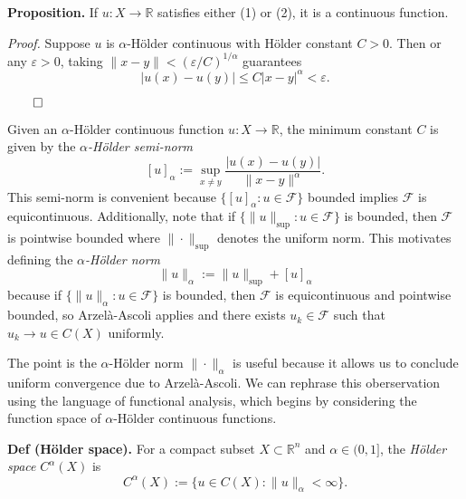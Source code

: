 \documentclass[
]{article}
\renewcommand{\square}{\hfill\qed}
\begin{document}
\textbf{Proposition.} If \(u: X \to \mathbb{R}\) satisfies either (1) or
(2), it is a continuous function.

\emph{Proof.} Suppose \(u\) is \(\alpha\)-Hölder continuous with Hölder
constant \(C > 0\). Then or any \(\varepsilon > 0\), taking
\(\|x-y\| < (\varepsilon/C)^{1/\alpha}\) guarantees \[
    |u(x)-u(y)| \leq C|x-y|^{\alpha} < \varepsilon.
\]

\(\square\)

Given an \(\alpha\)-Hölder continuous function \(u: X \to \mathbb{R}\),
the minimum constant \(C\) is given by the \emph{\(\alpha\)-Hölder
semi-norm} \[
    [u]_{\alpha} := \sup_{x \neq y}\frac{|u(x) - u(y)|}{\|x-y\|^{\alpha}}.
\] This semi-norm is convenient because
\(\{ [u]_{\alpha}: u \in \mathcal{F}\}\) bounded implies \(\mathcal{F}\)
is equicontinuous. Additionally, note that if
\(\{ \|u\|_{\sup}: u \in \mathcal{F}\}\) is bounded, then
\(\mathcal{F}\) is pointwise bounded where \(\| \cdot \|_{\sup}\)
denotes the uniform norm. This motivates defining the
\emph{\(\alpha\)-Hölder norm} \[
    \|u\|_{\alpha} := \|u\|_{\sup} + [u]_{\alpha}
\] because if \(\{\|u\|_{\alpha}: u \in \mathcal{F}\}\) is bounded, then
\(\mathcal{F}\) is equicontinuous and pointwise bounded, so
Arzelà-Ascoli applies and there exists \(u_k \in \mathcal{F}\) such that
\(u_k \to u \in C(X)\) uniformly.

The point is the \(\alpha\)-Hölder norm \(\|\cdot\|_{\alpha}\) is useful
because it allows us to conclude uniform convergence due to
Arzelà-Ascoli. We can rephrase this oberservation using the language of
functional analysis, which begins by considering the function space of
\(\alpha\)-Hölder continuous functions.

\textbf{Def (Hölder space).} For a compact subset
\(X \subset \mathbb{R}^n\) and \(\alpha \in (0,1]\), the \emph{Hölder
space} \(C^{\alpha}(X)\) is \[
    C^{\alpha}(X) := \{u \in C(X) : \|u\|_{\alpha} < \infty\}.
\]
\end{document}
